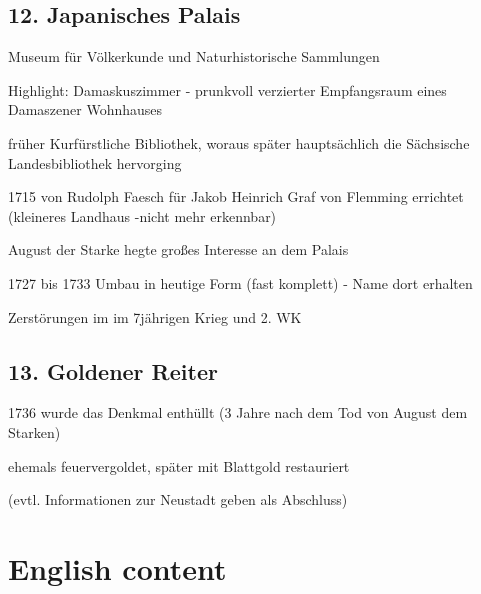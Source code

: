 \documentclass[a4paper,12pt]{report}
\begin{document}
\section{12. Japanisches Palais}
\begin{itemize*}
\item Museum für Völkerkunde und Naturhistorische Sammlungen
\item Highlight: Damaskuszimmer - prunkvoll verzierter Empfangsraum eines Damaszener Wohnhauses
\item früher Kurfürstliche Bibliothek, woraus später hauptsächlich die Sächsische Landesbibliothek hervorging
\item 1715 von Rudolph Faesch für Jakob Heinrich Graf von Flemming errichtet (kleineres Landhaus -nicht mehr erkennbar)
\item August der Starke hegte großes Interesse an dem Palais
\item 1727 bis 1733 Umbau in heutige Form (fast komplett) - Name dort erhalten
\item Zerstörungen im im 7jährigen Krieg und 2. WK
\end{itemize*}

\section{13. Goldener Reiter}
\begin{itemize*}
\item 1736 wurde das Denkmal enthüllt (3 Jahre nach dem Tod von August dem Starken)
\item ehemals feuervergoldet, später mit Blattgold restauriert
\item (evtl. Informationen zur Neustadt geben als Abschluss)
\end{itemize*}

\chapter{English content}
\end{document}
